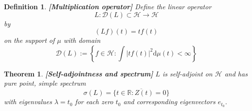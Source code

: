 \documentclass{article}
\newcommand{\assign}{:=}
\newcommand{\mathd}{\mathrm{d}}
\newcommand{\tmstrong}[1]{\textbf{#1}}
\newtheorem{definition}{Definition}
\newtheorem{theorem}{Theorem}
\begin{document}
\begin{definition}
  {\tmstrong{[Multiplication operator]\label{def:L}}} Define the linear
  operator
  \begin{equation}
    L : \mathcal{D} (L) \subset \mathcal{H} \to \mathcal{H}
  \end{equation}
  by
  \begin{equation}
    (Lf) (t) = tf (t)
  \end{equation}
  on the support of $\mu$ with domain
  \begin{equation}
    \mathcal{D} (L) \assign \left\{ f \in \mathcal{H}: \int |t f (t) |^2
    \mathd \mu (t) < \infty \right\}
  \end{equation}
\end{definition}

\begin{theorem}
  {\tmstrong{[Self-adjointness and spectrum]\label{thm:spectrum}}} $L$ is
  self-adjoint on $\mathcal{H}$ and has pure point, simple spectrum
  \begin{equation}
    \sigma (L) = \overline{\{t \in \mathbb{R}: Z (t) = 0\}}
  \end{equation}
  with eigenvalues $\lambda = t_0$ for each zero $t_0$ and corresponding
  eigenvectors $e_{t_0}$.
\end{theorem}
\end{document}
